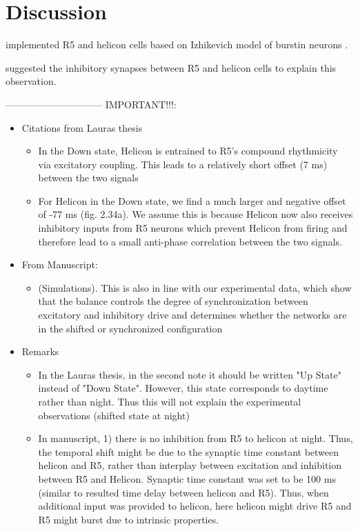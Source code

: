 \documentclass[../main.tex]{subfiles}
\begin{document}
\section{Discussion}
    

\color{orange}

\cite{krummSlowlyOscillatingBrain2021} implemented R5 and helicon cells based
on Izhikevich model of burstin neurons \cite{izhikevichSimpleModelSpiking2003}.

\cite{krummSlowlyOscillatingBrain2021} suggested the inhibitory synapses between R5 and
helicon cells to explain this observation.

\color{red}

------------------------------
IMPORTANT!!!:
\begin{itemize}
    \item Citations from Lauras thesis
    \begin{itemize}
        \item In the Down state, Helicon is entrained to R5's compound rhythmicity via excitatory
        coupling. This leads to a relatively short offset (7 ms) between the two signals
        \item For Helicon in the Down state, we find a much larger and negative offset of 
        -77 ms (fig. 2.34a). We assume this is because Helicon now also receives inhibitory inputs
        from R5 neurons which prevent Helicon from firing and therefore lead to a small anti-phase
        correlation between the two signals.
    \end{itemize}
    \item From Manuscript:
    \begin{itemize}
        \item (Simulations). This is also in line with our experimental data, which show
        that the balance controls the degree of synchronization between excitatory and inhibitory
        drive and determines whether the networks are in the shifted or synchronized configuration
    \end{itemize}
    \item Remarks
    \begin{itemize}
        \item In the Lauras thesis, in the second note it should be written "Up State" instead of
        "Down State". However, this state
        corresponds to daytime rather than night. Thus this will not explain the experimental
        observations (shifted state at night)
        \item In manuscript, 1) there is no inhibition from R5 to helicon at night. Thus,
        the temporal shift might be due to the synaptic time constant between helicon and R5,
        rather than interplay between excitation and inhibition between R5 and Helicon.
        Synaptic time constant was set to be 100 ms (similar to resulted time delay between helicon and R5).
        Thus, when additional input was provided to helicon, here helicon might drive R5 and R5 might burst due to intrinsic properties.
    \end{itemize}
\end{itemize}
\end{document}
